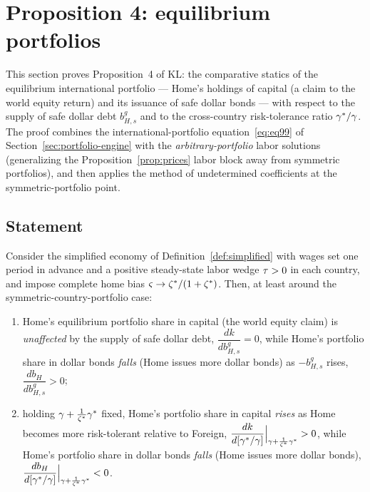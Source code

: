 \section{Proposition 4: equilibrium portfolios}
\label{sec:prop4}

This section proves Proposition~4 of KL: the comparative statics of the
equilibrium international portfolio --- Home's holdings of capital (a claim to the
world equity return) and its issuance of safe dollar bonds --- with respect to
the supply of safe dollar debt $b^g_{H,s}$ and to the cross-country risk-tolerance
ratio $\gamma^{*}/\gamma$. The proof combines the international-portfolio
equation~\eqref{eq:eq99} of Section~\ref{sec:portfolio-engine} with the
\emph{arbitrary-portfolio} labor solutions (generalizing the
Proposition~\ref{prop:prices} labor block away from symmetric portfolios), and
then applies the method of undetermined coefficients at the symmetric-portfolio
point.

\subsection{Statement}

\begin{proposition}
\label{prop:portfolios}
Consider the simplified economy of Definition~\ref{def:simplified} with wages set
one period in advance and a positive steady-state labor wedge $\tau>0$ in each
country, and impose complete home bias $\varsigma\to\zeta^{*}/(1+\zeta^{*})$. Then, at least
around the symmetric-country-portfolio case:
\begin{enumerate}[label=(\alph*),leftmargin=1.8em,itemsep=3pt]
  \item Home's equilibrium portfolio share in capital (the world equity claim) is
  \emph{unaffected} by the supply of safe dollar debt, $\dfrac{dk}{db^g_{H,s}}=0$,
  while Home's portfolio share in dollar bonds \emph{falls} (Home issues more
  dollar bonds) as $-b^g_{H,s}$ rises, $\dfrac{db_H}{db^g_{H,s}}>0$;
  \item holding $\gamma+\frac{1}{\zeta^{*}}\gamma^{*}$ fixed, Home's portfolio share in capital
  \emph{rises} as Home becomes more risk-tolerant relative to Foreign,
  $\dfrac{dk}{d[\gamma^{*}/\gamma]}\Big|_{\gamma+\frac{1}{\zeta^{*}}\gamma^{*}}>0$, while Home's
  portfolio share in dollar bonds \emph{falls} (Home issues more dollar bonds),
  $\dfrac{db_H}{d[\gamma^{*}/\gamma]}\Big|_{\gamma+\frac{1}{\zeta^{*}}\gamma^{*}}<0$.
\end{enumerate}
\end{proposition}


